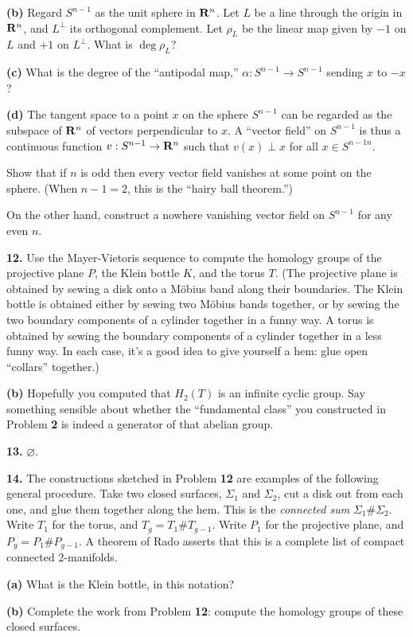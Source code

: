 \documentclass[12pt]{article}
\begin{document}
{\bf (b)} Regard $S^{n-1}$ as the unit sphere in $\mathbf R^n$. 
Let $L$ be a line through the origin in $\mathbf R^n$, and $L^\perp$ its 
orthogonal complement. Let $\rho_L$ be the linear map given by $-1$ on $L$
and $+1$ on $L^\perp$. What is $\deg\rho_L$?

{\bf(c)} What is the degree of the ``antipodal map,'' 
$\alpha:S^{n-1}\to S^{n-1}$ sending $x$ to $-x$? 

{\bf(d)} The tangent space to a point $x$ on the sphere $S^{n-1}$  can be
regarded as the subspace of $\mathbf R^n$ of vectors perpendicular to $x$. 
A ``vector field'' on $S^{n-1}$ is thus a continuous function 
$v:S^{n-1}\to\mathbf R^n$ such that $v(x)\perp x$ for all $x\in S^{n-1n}$.

Show that if $n$ is odd then every vector field vanishes at some point on
the sphere. (When $n-1=2$, this is the ``hairy ball theorem.'')

On the other hand, construct a nowhere vanishing vector field on $S^{n-1}$
for any even $n$.

\medskip
{\bf 12.} Use the Mayer-Vietoris sequence to compute the homology groups of
the projective plane $P$, the Klein bottle $K$, and the torus $T$. 
(The projective
plane is obtained by sewing a disk onto a M\"obius band along their
boundaries. The Klein bottle is obtained either by sewing two M\"obius bands 
together, or by sewing the two boundary components of a cylinder together 
in a funny way. 
A torus is obtained by sewing the boundary components of a cylinder together
in a less funny way. In each case, it's a good idea to give yourself a hem: 
glue open ``collars'' together.)

{\bf(b)} Hopefully you computed that $H_2(T)$ is an infinite cyclic group.
Say something sensible about whether the ``fundamental class'' you 
constructed in Problem {\bf 2} is indeed a generator of that abelian group.

\medskip
{\bf 13.} $\varnothing$.

\medskip
{\bf 14.} 
The constructions sketched in Problem {\bf 12} are examples of the following
general procedure. Take two closed surfaces,
$\Sigma_1$ and $\Sigma_2$, cut a disk out from each one, and glue them 
together along the hem. This is the {\em connected sum} $\Sigma_1\#\Sigma_2$. 
Write $T_1$ for the torus, and $T_g=T_1\# T_{g-1}$. Write $P_1$ for the 
projective plane, and $P_g=P_1\#P_{g-1}$.
A theorem of Rado asserts that this is a complete list of compact connected 
2-manifolds. 

{\bf (a)} What is the Klein bottle, in this notation?

{\bf (b)} Complete the work from Problem {\bf 12}: compute the homology groups
of these closed surfaces. 
\end{document}
